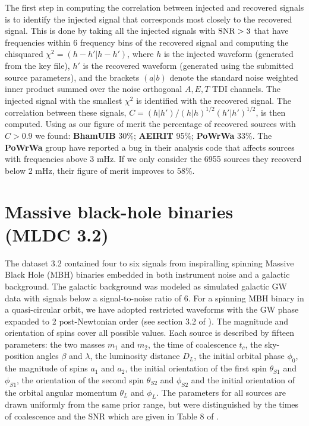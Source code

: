 \documentclass{iopart}
\begin{document}
The first step in computing the correlation between injected and recovered
signals is to identify the injected signal that corresponds most closely
to the recovered signal. This is done by taking all the injected signals
with ${\rm SNR} > 3$ that have frequencies within 6 frequency bins of the
recovered signal and computing the chisquared $\chi^2 = (h-h' \vert h- h')$,
where $h$ is the injected waveform (generated from the key file),
$h'$ is the recovered waveform (generated using the submitted source
parameters), and the brackets $(a\vert b)$ denote the standard noise weighted
inner product summed over the noise orthogonal $A,E,T$ TDI channels.
The injected signal with the smallest $\chi^2$ is identified with the
recovered signal. The correlation between these signals, $C= (h \vert h')/
(h\vert h)^{1/2} (h' \vert h')^{1/2}$, is then computed. Using as our
figure of merit the percentage of recovered sources with $C > 0.9$ we
found: \textbf{BhamUIB} 30\%; \textbf{AEIRIT} 95\%; \textbf{PoWrWa} 33\%.
The \textbf{PoWrWa} group have reported a bug in their analysis
code that affects sources with frequencies above 3 mHz. If we only
consider the 6955 sources they recoverd below 2 mHz, their figure of
merit improves to 58\%.

\section{Massive black-hole binaries (MLDC 3.2)}

The dataset 3.2 contained four to six signals from inspiralling spinning Massive Black Hole (MBH) binaries embedded in both instrument noise and a galactic background. The galactic background was modeled as simulated 
galactic GW data with signals below  a signal-to-noise ratio  of 6. 
For a spinning MBH binary in a quasi-circular orbit, we have adopted restricted waveforms with 
the GW phase expanded to 2 post-Newtonian order (see section 3.2 of \cite{MLDC3}). The magnitude and orientation of spins cover all possible values.  Each source is described by fifteen parameters: the two masses $m_{1}$ and $m_{2}$, the time of coalescence $t_{c}$, the sky-position angles $\beta$ and $\lambda$, the luminosity distance $D_{L}$, the initial orbital phase $\phi_{0}$, the magnitude of spins $a_{1}$ and $a_{2}$, the initial orientation of the first spin  $\theta_{S1}$ and $\phi_{S1}$, the orientation of the second spin $\theta_{S2}$ and $\phi_{S2}$ and the initial orientation of the orbital angular momentum  $\theta_{L}$ and $\phi_{L}$. The parameters for all sources are drawn uniformly from the 
same prior range, but were distinguished by the times of coalescence and the SNR which are given in Table 8 of \cite{MLDC3}.
\end{document}
